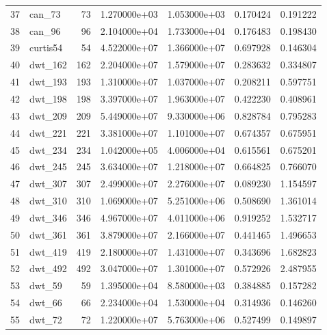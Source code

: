 \begin{tabular}{llrrrrr}
37  &                   can\_73 &    73 &  1.270000e+03 &  1.053000e+03 &  0.170424 &   0.191222 \\
38  &                   can\_96 &    96 &  2.104000e+04 &  1.733000e+04 &  0.176483 &   0.198430 \\
39  &                 curtis54 &    54 &  4.522000e+07 &  1.366000e+07 &  0.697928 &   0.146304 \\
40  &                  dwt\_162 &   162 &  2.204000e+07 &  1.579000e+07 &  0.283632 &   0.334807 \\
41  &                  dwt\_193 &   193 &  1.310000e+07 &  1.037000e+07 &  0.208211 &   0.597751 \\
42  &                  dwt\_198 &   198 &  3.397000e+07 &  1.963000e+07 &  0.422230 &   0.408961 \\
43  &                  dwt\_209 &   209 &  5.449000e+07 &  9.330000e+06 &  0.828784 &   0.795283 \\
44  &                  dwt\_221 &   221 &  3.381000e+07 &  1.101000e+07 &  0.674357 &   0.675951 \\
45  &                  dwt\_234 &   234 &  1.042000e+05 &  4.006000e+04 &  0.615561 &   0.675201 \\
46  &                  dwt\_245 &   245 &  3.634000e+07 &  1.218000e+07 &  0.664825 &   0.766070 \\
47  &                  dwt\_307 &   307 &  2.499000e+07 &  2.276000e+07 &  0.089230 &   1.154597 \\
48  &                  dwt\_310 &   310 &  1.069000e+07 &  5.251000e+06 &  0.508690 &   1.361014 \\
49  &                  dwt\_346 &   346 &  4.967000e+07 &  4.011000e+06 &  0.919252 &   1.532717 \\
50  &                  dwt\_361 &   361 &  3.879000e+07 &  2.166000e+07 &  0.441465 &   1.496653 \\
51  &                  dwt\_419 &   419 &  2.180000e+07 &  1.431000e+07 &  0.343696 &   1.682823 \\
52  &                  dwt\_492 &   492 &  3.047000e+07 &  1.301000e+07 &  0.572926 &   2.487955 \\
53  &                   dwt\_59 &    59 &  1.395000e+04 &  8.580000e+03 &  0.384885 &   0.157282 \\
54  &                   dwt\_66 &    66 &  2.234000e+04 &  1.530000e+04 &  0.314936 &   0.146260 \\
55  &                   dwt\_72 &    72 &  1.220000e+07 &  5.763000e+06 &  0.527499 &   0.149897 \\

\end{tabular}
